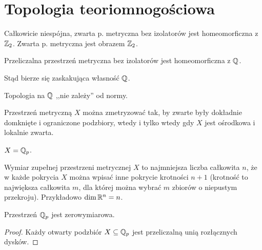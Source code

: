 \section{Topologia teoriomnogościowa}

\begin{fakt}
	Całkowicie niespójna, zwarta p. metryczna bez izolatorów jest homeomorficzna z $\mathbb Z_2$.
	Zwarta p. metryczna jest obrazem $\mathbb Z_2$.
\end{fakt}

\begin{twierdzenie}[Sierpiński]
	Przeliczalna przestrzeń metryczna bez izolatorów jest homeomorficzna z $\mathbb Q$.
\end{twierdzenie}

Stąd bierze się zaskakująca własność $\mathbb Q$.

\begin{wniosek}
	Topologia na $\mathbb Q$ ,,nie zależy'' od normy.
\end{wniosek}

\begin{twierdzenie}[Vaughan, 1937]
	Przestrzeń metryczną $X$ można zmetryzować tak, by zwarte były dokładnie domknięte i ograniczone podzbiory, wtedy i tylko wtedy gdy $X$ jest ośrodkowa i lokalnie zwarta.
\end{twierdzenie}

\begin{przyklad}
	 $X = \mathbb Q_p$.
\end{przyklad}

Wymiar zupełnej przestrzeni metrycznej $X$ to najmniejsza liczba całkowita $n$, że w każde pokrycia $X$ można wpisać inne pokrycie krotności $n + 1$ (krotność to największa całkowita $m$, dla której można wybrać $m$ zbiorów o niepustym przekroju).
Przykładowo $\dim \mathbb R^n = n$.

\begin{fakt}
	Przestrzeń $\mathbb Q_p$ jest zerowymiarowa.
\end{fakt}

\begin{proof}
	Każdy otwarty podzbiór $X \subseteq \mathbb Q_p$ jest przeliczalną unią rozłącznych dysków.
\end{proof}	